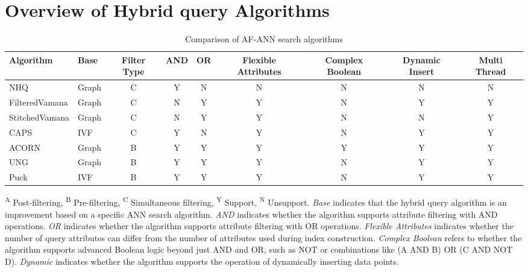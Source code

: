 \documentclass[sigconf, nonacm]{acmart}
\begin{document}
	
	\section{Overview of Hybrid query Algorithms}
	
	\setlength{\textfloatsep}{0cm}
	\setlength{\floatsep}{0cm}
	\renewcommand{\arraystretch}{0.9}
	\begin{table}[t]
		\centering
		\setlength{\abovecaptionskip}{0cm}
		\setlength{\belowcaptionskip}{-0.3cm}
		\caption{Comparison of AF-ANN search algorithms}
		\small
		\label{tab:compair_1}
		\begin{tabular}{|l|l|c|c|c|c|c|c|c|}
			\hline
			\textbf{Algorithm} & \textbf{Base} & \textbf{Filter Type} & \textbf{AND} & \textbf{OR} & \textbf{Flexible Attributes} & \textbf{Complex Boolean} & \textbf{Dynamic Insert} & \textbf{Multi Thread} \\
			\hline
			NHQ & Graph & C & Y & N& N& N & N & N \\
			FilteredVamana & Graph & C & N & Y & Y & N & Y & Y \\
			StitchedVamana & Graph & C & N & Y & Y & N & N & Y  \\
			CAPS & IVF & C & Y & N & Y & N & Y & Y \\
			ACORN & Graph & B & Y & Y & Y & Y & Y & Y \\
			UNG & Graph & B & Y & Y & Y & N & Y & Y \\ 
			Puck & IVF & B & Y & Y & Y & N & Y & Y \\
			
			\hline
			
		\end{tabular}
		
		
		\centering
		\footnotesize{
			\begin{minipage}{\linewidth}
				\vspace{0.1cm}
				\textsuperscript{A} Post-filtering, 
				\textsuperscript{B} Pre-filtering, 
				\textsuperscript{C} Simultaneous filtering, 
				\textsuperscript{Y} Support, 
				\textsuperscript{N} Unsupport. 
				\textit{Base} indicates that the hybrid query algorithm is an improvement based on a specific ANN search algorithm. 
				\textit{AND} indicates whether the algorithm supports attribute filtering with AND operations. 
				\textit{OR} indicates whether the algorithm supports attribute filtering with OR operations. 
				\textit{Flexible Attributes} indicates whether the number of query attributes can differ from the number of attributes used during index construction. 
				\textit{Complex Boolean} refers to whether the algorithm supports advanced Boolean logic beyond just AND and OR, such as NOT or combinations like (A AND B) OR (C AND NOT D). 
				\textit{Dynamic} indicates whether the algorithm supports the operation of dynamically inserting data points.
		\end{minipage}}
		\vspace{-0.5cm}
	\end{table}
	
\end{document}
